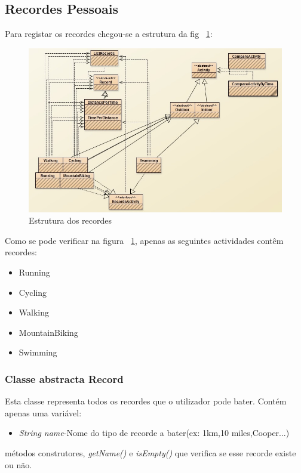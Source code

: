 \documentclass[10pt,notitlepage]{article}
\begin{document}
\subsection{Recordes Pessoais}
Para registar os recordes chegou-se a estrutura da fig ~\ref{fig:recordes}:
~\\
\begin{figure}[h]
\centering
\includegraphics[scale=0.6]{Records.jpg}
\caption{Estrutura dos recordes}
\label{fig:recordes}
\end{figure}


Como se pode verificar na figura ~\ref{fig:recordes}, apenas as seguintes actividades contêm recordes:
\begin{itemize}
\item Running
\item Cycling
\item Walking
\item MountainBiking
\item Swimming
\end{itemize}


\subsubsection{Classe abstracta Record}

Esta classe representa todos os recordes que o utilizador pode bater. Contém apenas uma variável:
\begin{itemize}
\item \textit{String name}-Nome do tipo de recorde a bater(ex: 1km,10 miles,Cooper...)
\end{itemize}
métodos construtores, \textit{getName()} e \textit{isEmpty()} que verifica se esse recorde existe ou não.
\end{document}
